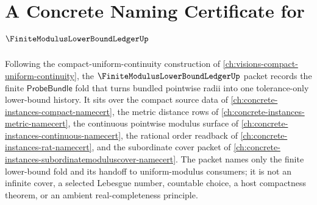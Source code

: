\chapter{A Concrete Naming Certificate for $\FiniteModulusLowerBoundLedgerUp$}
\label{ch:concrete-instances-finite-modulus-lower-bound-ledger-namecert}

Following the compact-uniform-continuity construction of \autoref{ch:visions-compact-uniform-continuity}, the $\FiniteModulusLowerBoundLedgerUp$ packet records the finite $\mathsf{ProbeBundle}$ fold that turns bundled pointwise radii into one tolerance-only lower-bound history. It sits over the compact source data of \autoref{ch:concrete-instances-compact-namecert}, the metric distance rows of \autoref{ch:concrete-instances-metric-namecert}, the continuous pointwise modulus surface of \autoref{ch:concrete-instances-continuous-namecert}, the rational order readback of \autoref{ch:concrete-instances-rat-namecert}, and the subordinate cover packet of \autoref{ch:concrete-instances-subordinatemoduluscover-namecert}. The packet names only the finite lower-bound fold and its handoff to uniform-modulus consumers; it is not an infinite cover, a selected Lebesgue number, countable choice, a host compactness theorem, or an ambient real-completeness principle.

